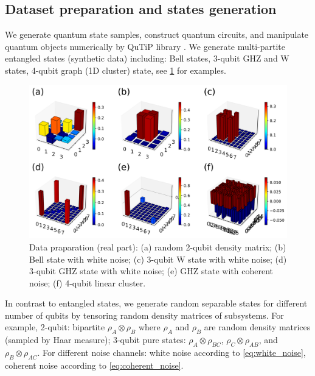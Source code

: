 \documentclass[
aps,
pra,
twocolumn,
floatfix,
]{revtex4-2}
\theoremstyle{plain}
\theoremstyle{definition}
\newcommand{\dm}{\rho}
\begin{document}
\subsection{Dataset preparation and states generation}\label{sec:data}
We generate quantum state samples, construct quantum circuits, and manipulate quantum objects numerically by QuTiP library \cite{johanssonQuTiPPythonFramework2013} \cite{liPulselevelNoisyQuantum2022}.
We generate multi-partite entangled states (synthetic data) including: Bell states, 3-qubit GHZ and W states, 4-qubit graph (1D cluster) state, see \cref{fig:sample_data} for examples.
\begin{figure}[!ht]
	\centering
	\includegraphics[width=.9\linewidth]{./Code/dataset_sample_3x2.png}
	\caption{Data praparation (real part): (a) random 2-qubit density matrix; (b) Bell state with white noise; (c) 3-qubit W state with white noise; (d) 3-qubit GHZ state with white noise; (e) GHZ state with coherent noise; (f) 4-qubit linear cluster.}
	\label{fig:sample_data}
\end{figure}
In contrast to entangled states, we generate random separable states for different number of qubits by tensoring random density matrices of subsystems.
For example,
2-qubit: bipartite $\rho_A\otimes \rho_B$ where $\rho_A$ and $\rho_B$ are random density matrices (sampled by Haar measure);
3-qubit pure states: $\dm_A\otimes \dm_{BC}$, $\dm_C\otimes \dm_{AB}$, and $\dm_B\otimes \dm_{AC}$.
For different noise channels: white noise according to \cref{eq:white_noise}, coherent noise according to \cref{eq:coherent_noise}.
\end{document}
